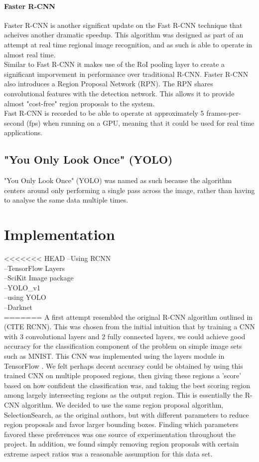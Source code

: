 \documentclass[10pt]{article}
\begin{document}
\paragraph{Faster R-CNN}
Faster R-CNN \cite{faster_rcnn} is another significat update on the Fast R-CNN technique that acheives another dramatic speedup. This algorithm was designed as part of an attempt at real time regional image recognition, and as such is able to operate in almost real time. \\
Similar to Fast R-CNN it makes use of the RoI pooling layer to create a significant imporvement in performance over traditional R-CNN. Faster R-CNN also introduces a Region Proposal Network (RPN). The RPN shares convolutional features with the detection network. This allows it to provide almost "cost-free" region proposals to the system. \\
Fast R-CNN is recorded to be able to operate at approximately 5 frames-per-second (fps) when running on a GPU, meaning that it could be used for real time applications.
	

\subsection{"You Only Look Once" (YOLO)}
"You Only Look Once" (YOLO) was named as such because the algorithm centers around only performing a single pass across the image, rather than having to analyse the same data multiple times.
	

\section{Implementation}
<<<<<<< HEAD
--Using RCNN \cite{rcnn}\\
--TensorFlow Layers \cite{tensorflow}\\
--SciKit Image package\cite{skimage}\\
--YOLO\_v1\cite{yolo_v1}\\
--using YOLO\cite{yolo_v2}\\
--Darknet\\
=======
A first attempt resembled the original R-CNN algorithm outlined in (CITE RCNN). This was chosen from the initial intuition that by training a CNN with 3 convolutional layers and 2 fully connected layers, we could achieve good accuracy for the classification component of the problem on simple image sets such as MNIST. This CNN was implemented using the layers module in TensorFlow \cite{tensorflow}. We felt perhaps decent accuracy could be obtained by using this trained CNN on multiple proposed regions, then giving these regions a 'score' based on how confident the classification was, and taking the best scoring region among largely intersecting regions as the output region. This is essentially the R-CNN algorithm. We decided to use the same region proposal algorithm, SelectionSearch, as the original authors, but with different parameters to reduce region proposals and favor larger bounding boxes. Finding which parameters favored these preferences was one source of experimentation throughout the project. In addition, we found simply removing region proposals with certain extreme aspect ratios was a reasonable assumption for this data set.
\end{document}
